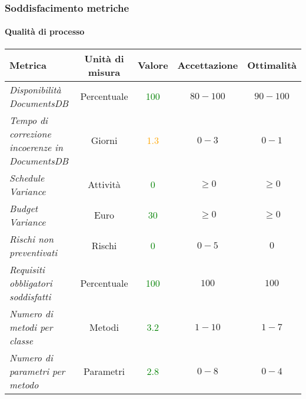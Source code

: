 \newpage
\subsubsection{Soddisfacimento metriche}

\paragraph{Qualità di processo}
\begin{longtable}{|>{\centering}m{5cm}|c|c|c|c|}
\hline
\textbf{Metrica} & \textbf{Unità di misura} & \textbf{Valore} & \textbf{Accettazione} & \textbf{Ottimalità}\\
\hline
\endhead
\emph{Disponibilità DocumentsDB} & {Percentuale} & \textcolor{Green}{100} & $80 - 100$ & $90 - 100$\\ \hline
\emph{Tempo di correzione incoerenze in DocumentsDB} & {Giorni} & \textcolor{Orange}{1.3} & $0 - 3$ & $0 - 1$\\ \hline
\emph{Schedule Variance} & {Attività} & \textcolor{Green}{0} & $\geq 0$  & $\geq 0$\\ \hline
\emph{Budget Variance} & {Euro} & \textcolor{Green}{30} & $\geq 0$ & $\geq 0$\\ \hline
\emph{Rischi non preventivati} & {Rischi} & \textcolor{Green}{0} & $0 - 5$ & $0$\\ \hline
\emph{Requisiti obbligatori soddisfatti} & {Percentuale} & \textcolor{Green}{100} & $100$ & $100$\\ \hline
\emph{Numero di metodi per classe} & {Metodi} & \textcolor{Green}{3.2} & $1 - 10$ & $1 - 7$\\ \hline
\emph{Numero di parametri per metodo} & {Parametri} & \textcolor{Green}{2.8} & $0 - 8$ & $0 - 4$\\ \hline

\end{longtable}
